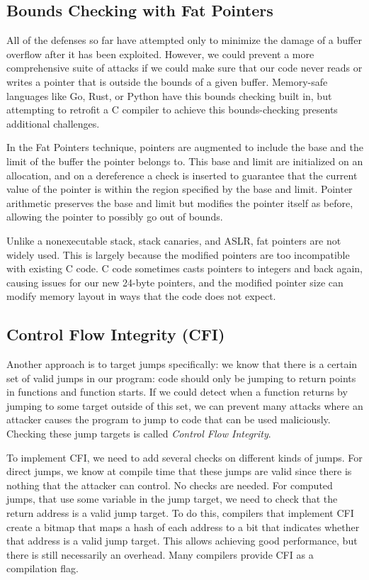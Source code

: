 \subsection{Bounds Checking with Fat Pointers}
All of the defenses so far have attempted only to minimize the damage of a buffer overflow after it has been exploited. However, we could prevent a more comprehensive suite of attacks if we could make sure that our code never reads or writes a pointer that is outside the bounds of a given buffer. Memory-safe languages like Go, Rust, or Python have this bounds checking built in, but attempting to retrofit a C compiler to achieve this bounds-checking presents additional challenges.

In the Fat Pointers technique, pointers are augmented to include the base and the limit of the buffer the pointer belongs to. This base and limit are initialized on an allocation, and on a dereference a check is inserted to guarantee that the current value of the pointer is within the region specified by the base and limit. Pointer arithmetic preserves the base and limit but modifies the pointer itself as before, allowing the pointer to possibly go out of bounds.

Unlike a nonexecutable stack, stack canaries, and ASLR, fat pointers are not widely used. This is largely because the modified  pointers are too incompatible with existing C code. C code sometimes casts pointers to integers and back again, causing issues for our new 24-byte pointers, and the modified pointer size can modify memory layout in ways that the code does not expect.

\subsection{Control Flow Integrity (CFI)}
Another approach is to target jumps specifically: we know that there is a certain set of valid jumps in our program: code should only be jumping to return points in functions and function starts. If we could detect when a function returns by jumping to some target outside of this set, we can prevent many attacks where an attacker causes the program to jump to code that can be used maliciously. Checking these jump targets is called \emph{Control Flow Integrity}.

To implement CFI, we need to add several checks on different kinds of jumps. For direct jumps, we know at compile time that these jumps are valid since there is nothing that the attacker can control. No checks are needed. For computed jumps, that use some variable in the jump target, we need to check that the return address is a valid jump target. To do this, compilers that implement CFI create a bitmap that maps a hash of each address to a bit that indicates whether that address is a valid jump target. This allows achieving good performance, but there is still necessarily an overhead. Many compilers provide CFI as a compilation flag.

